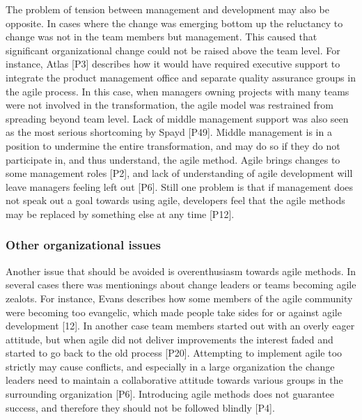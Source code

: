 \documentclass[preprint,authoryear,12pt]{elsarticle}
\begin{document}
The problem of tension between management and development may also be opposite.
In cases where the change was emerging bottom up the reluctancy to change was
not in the team members but management. This caused that significant
organizational change could not be raised above the team level.
For instance, Atlas [P3] describes how it would have required executive support
to integrate the product management office and separate quality assurance groups
in the agile process. In this case, when managers owning projects with many
teams were not involved in the transformation, the agile model was restrained
from spreading beyond team level. Lack of middle management support was also
seen as the most serious shortcoming by Spayd [P49]. Middle management is in a
position to undermine the entire transformation, and may do so if they do not
participate in, and thus understand, the agile method. Agile brings changes to
some management roles [P2], and lack of understanding of agile development will
leave managers feeling left out [P6]. Still one problem is that if management
does not speak out a goal towards using agile, developers feel that the agile
methods may be replaced by something else at any time [P12].

\subsubsection{Other organizational issues}



Another issue that should be avoided is overenthusiasm towards agile methods.
In several cases there was mentionings about change leaders or teams becoming
agile zealots. For instance, Evans describes how some members of the agile
community were becoming too evangelic, which made people take sides for or
against agile development [12]. In another case team members started out with an
overly eager attitude, but when agile did not deliver improvements the
interest faded and started to go back to the old process [P20]. Attempting to
implement agile too strictly may cause conflicts, and especially in a large
organization the change leaders need to maintain a collaborative attitude
towards various groups in the surrounding organization [P6]. Introducing agile
methods does not guarantee success, and therefore they should not be followed
blindly [P4].

\end{document}
